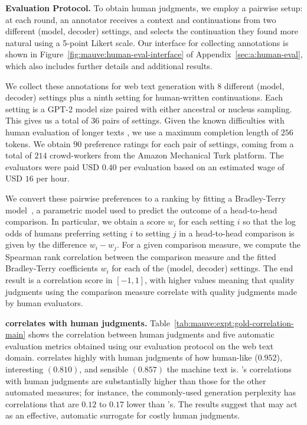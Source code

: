 \documentclass{article}
\newcommand{\myparagraph}[1]{\par\noindent\textbf{{#1}.}} %
\theoremstyle{definition}
\newcommand{\name}{{\fontfamily{bch}\selectfont{\textsc{Mauve}}}\xspace}
\begin{document}
\myparagraph{Evaluation Protocol}
To obtain human judgments, we employ a pairwise setup: at each round, an annotator receives a context and continuations from two different (model, decoder) settings, and selects the continuation they found more natural using a 5-point Likert scale.
Our interface for collecting annotations is shown in Figure~\ref{fig:mauve:human-eval-interface} of Appendix~\ref{sec:a:human-eval}, which also includes further details and additional results.

We collect these annotations for web text generation with 8 different (model, decoder) settings plus a ninth setting for human-written continuations. Each setting is a GPT-2 model size paired with either ancestral or nucleus sampling. This gives us a total of $36$ pairs of settings.
Given the known difficulties with human evaluation of longer texts \cite{ippolito2020automatic}, we use a maximum completion length of $256$ tokens.
We obtain $90$ preference ratings for each pair of settings, coming from a total of $214$ crowd-workers from the Amazon Mechanical Turk platform.
The evaluators were paid USD $0.40$ per evaluation based on an estimated wage of USD $16$ per hour.

We convert these pairwise preferences to a ranking by fitting a Bradley-Terry model~\cite{bt:book:1995}, a parametric model used to predict the outcome of a head-to-head comparison. In particular, we obtain a score $w_i$ for each setting $i$ so that the log odds of humans preferring setting $i$ to setting $j$ in a head-to-head comparison is given by the difference $w_i - w_j$.
For a given comparison measure, 
we compute the Spearman rank correlation between the comparison measure and the fitted Bradley-Terry coefficients $w_i$ for each of the (model, decoder) settings.
The end result is a correlation score in $[-1,1]$, with higher values meaning that quality judgments using the comparison measure correlate with quality judgments made by human evaluators.

%
%

%

%

\myparagraph{\name correlates with human judgments}
Table~\ref{tab:mauve:expt:gold-correlation-main} shows the correlation between human judgments and five automatic evaluation metrics obtained using our evaluation protocol on the web text domain.
\name correlates highly with human judgments of how human-like ($0.952$), interesting $(0.810)$, and sensible $(0.857)$ the machine text is.
\name's correlations with human judgments are substantially higher than those for the other automated measures; for instance, the commonly-used generation perplexity has correlations that are $0.12$ to $0.17$ lower than \name's.
The results suggest that \name may act as an effective, automatic surrogate for costly human judgments.
%
\end{document}
